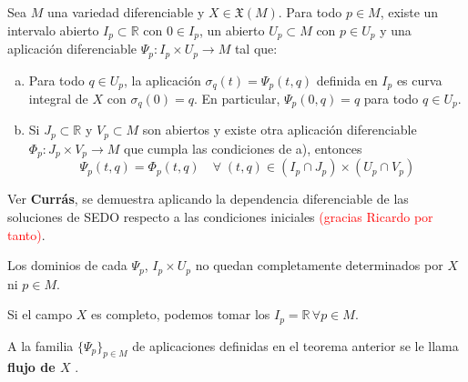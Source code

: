 \begin{teo}
Sea $M$ una variedad diferenciable y $X \in \mathfrak{X}(M)$. Para todo $p \in M$, existe un intervalo abierto $I_p \subset \mathbb{R}$ con $0 \in I_p$, un abierto $U_p \subset M$ con $p \in U_p$ y una aplicación diferenciable $\Psi_p:I_p \times U_p \to M$ tal que:
\begin{enumerate}[a)]
    \item Para todo $q \in U_p$, la aplicaci\'on $\sigma_q(t) = \Psi_p(t,q)$ definida en $I_p$ es curva integral de $X$ con $\sigma_q(0)=q$. En particular, $\Psi_p(0,q) = q$ para todo $q \in U_p$.
    \item Si $J_p \subset \mathbb R$ y $V_p \subset M$ son abiertos y existe otra aplicación diferenciable $\Phi_p:J_p \times V_p \to M$ que cumpla las condiciones de a), entonces $$\Psi_p(t,q) = \Phi_p(t,q) \quad \forall\; (t,q) \in (I_p\cap J_p) \times (U_p \cap V_p)$$
\end{enumerate}
\end{teo}
\begin{dem}
Ver \textbf{Currás}, se demuestra aplicando la dependencia diferenciable de las soluciones de SEDO respecto a las condiciones iniciales \textcolor{red}{(gracias Ricardo por tanto)}.
\end{dem}
\begin{obs}
Los dominios de cada $\Psi_p$, $I_p \times U_p$ no quedan completamente determinados por $X$ ni $p\in M$. 
\end{obs}
\begin{obs}
Si el campo $X$ es completo, podemos tomar los $I_p = \mathbb{R} \, \forall p \in M$.
\end{obs}

\begin{defi}
A la familia $\{\Psi_p\}_{p \in M}$ de aplicaciones definidas en el teorema anterior se le llama \textbf{flujo de $X$} .
\end{defi}

